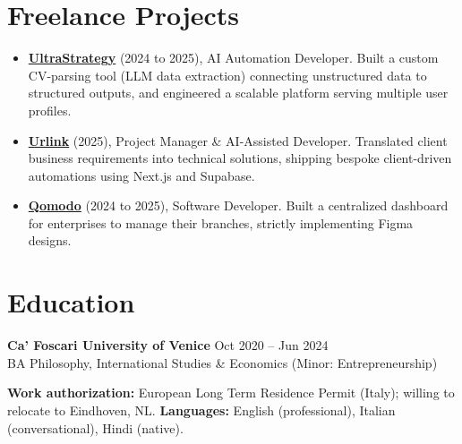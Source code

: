 \documentclass[a4paper,10pt]{article}
\begin{document}
\section{Freelance Projects}
\begin{itemize}
 \item \textbf{\href{https://ultrastrategy.com}{UltraStrategy}} (2024 to 2025), AI Automation Developer. Built a custom CV-parsing tool (LLM data extraction) connecting unstructured data to structured outputs, and engineered a scalable platform serving multiple user profiles.
 \item \textbf{\href{https://smarturlink.com/}{Urlink}} (2025), Project Manager \& AI-Assisted Developer. Translated client business requirements into technical solutions, shipping bespoke client-driven automations using Next.js and Supabase.
 \item \textbf{\href{https://www.qomodo.me/}{Qomodo}} (2024 to 2025), Software Developer. Built a centralized dashboard for enterprises to manage their branches, strictly implementing Figma designs.
\end{itemize}

\section{Education}
\textbf{Ca' Foscari University of Venice} \hfill Oct 2020 -- Jun 2024\\
BA Philosophy, International Studies \& Economics (Minor: Entrepreneurship)

\vspace{2pt}
{\small \textbf{Work authorization:} European Long Term Residence Permit (Italy); willing to relocate to Eindhoven, NL. \quad \textbf{Languages:} English (professional), Italian (conversational), Hindi (native).}
\end{document}
